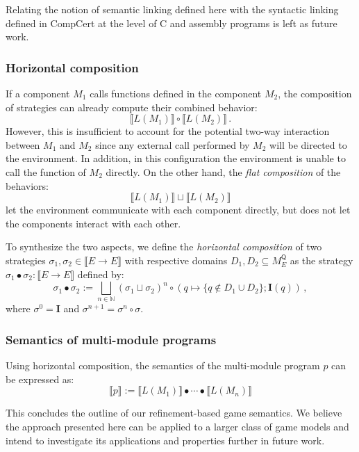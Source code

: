 \documentclass[sigplan,10pt,review,anonymous]{acmart}
\newcommand{\kw}[1]{\ensuremath{ \mathsf{#1} }}
\begin{document}
Relating the notion of semantic linking defined here
with the syntactic linking defined in CompCert
at the level of C and assembly programs
is left as future work.

\subsubsection{Horizontal composition}

If a component $M_1$ calls functions defined
in the component $M_2$,
the composition of strategies
can already compute their combined behavior:
\[
    \llbracket L(M_1) \rrbracket \circ
    \llbracket L(M_2) \rrbracket \,.
\]
However,
this is insufficient to account for
the potential two-way interaction between $M_1$ and $M_2$
since any external call performed by $M_2$
will be directed to the environment.
In addition,
in this configuration the environment
is unable to call the function of $M_2$ directly.
On the other hand,
the \emph{flat composition} of the behaviors:
\[
    \llbracket L(M_1) \rrbracket \sqcup
    \llbracket L(M_2) \rrbracket
\]
let the environment communicate with each component directly,
but does not let the components interact with each other.

To synthesize the two aspects,
we define the \emph{horizontal composition}
of two strategies $\sigma_1, \sigma_2 \in \llbracket E \rightarrow E \rrbracket$
with respective domains $D_1, D_2 \subseteq M_E^\kw{Q}$
as the strategy $\sigma_1 \bullet \sigma_2 : \llbracket E \rightarrow E
\rrbracket$ defined by:
\[
    \sigma_1 \bullet \sigma_2 :=
      \bigsqcup_{n \in \mathbb{N}} (\sigma_1 \sqcup \sigma_2)^n \circ
        (q \mapsto \{ q \notin D_1 \cup D_2 \} ; \mathbf{I}(q))
 \,,
\]
where $\sigma^0 = \mathbf{I}$ and $\sigma^{n+1} = \sigma^n \circ
\sigma$.

\subsubsection{Semantics of multi-module programs}

Using horizontal composition,
the semantics of the multi-module program $p$
can be expressed as:
\[
    \llbracket p \rrbracket :=
    \llbracket L(M_1) \rrbracket \bullet \cdots \bullet
    \llbracket L(M_n) \rrbracket
\]

This concludes the outline of our refinement-based game semantics.
We believe the approach presented here can be applied to a larger class
of game models and intend to investigate its applications
and properties further in future work.
\end{document}
